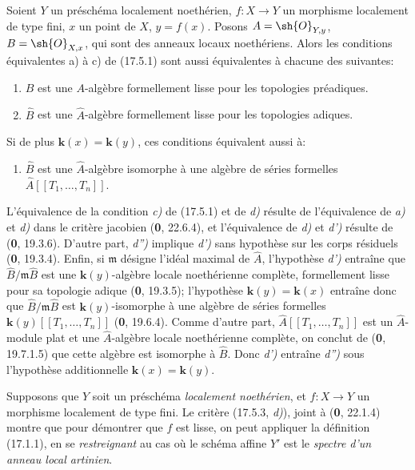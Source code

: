 \begin{proposition}[17.5.3]
\label{IV.17.5.3}
Soient $Y$ un préschéma \textup{localement noethérien}, $f:X\to Y$ un morphisme localement de type fini, $x$ un point de $X$, $y=f(x)$. Posons $A=\sh{O}_{Y,y}$, $B=\sh{O}_{X,x}$, qui sont des anneaux locaux noethériens. Alors les conditions équivalentes \textup{a)} à \textup{c)} de \textup{(17.5.1)} sont aussi équivalentes à chacune des suivantes:
\begin{enumerate}
  \item[\textup{d)}] $B$ est une $A$-algèbre formellement lisse pour les topologies préadiques.
  \item[\textup{d$'$)}] $\widehat B$ est une $\widehat A$-algèbre formellement lisse pour les topologies adiques.
\end{enumerate}
Si de plus $\boldsymbol{k}(x)=\boldsymbol{k}(y)$, ces conditions équivalent aussi à:
\begin{enumerate}
  \item[\textup{d$''$)}] $\widehat B$ est une $\widehat A$-algèbre isomorphe à une algèbre de séries formelles $\widehat A[[T_1,\ldots,T_n]]$.
\end{enumerate}
\end{proposition}

L'équivalence de la condition \emph{c)} de (17.5.1) et de \emph{d)} résulte de l'équivalence de \emph{a)} et \emph{d)} dans le critère jacobien (\textbf{0}, 22.6.4), et l'équivalence de \emph{d)} et \emph{d')} résulte de (\textbf{0}, 19.3.6). D'autre part, \emph{d'')} implique \emph{d')} sans hypothèse sur les corps résiduels (\textbf{0}, 19.3.4). Enfin, si $\mathfrak m$ désigne l'idéal maximal de $\widehat A$, l'hypothèse \emph{d')} entraîne que $\widehat B/\mathfrak m\widehat B$ est une $\boldsymbol{k}(y)$-algèbre locale noethérienne complète, formellement lisse pour sa topologie adique (\textbf{0}, 19.3.5); l'hypothèse $\boldsymbol{k}(y)=\boldsymbol{k}(x)$ entraîne donc que $\widehat B/\mathfrak m\widehat B$ est $\boldsymbol{k}(y)$-isomorphe à une algèbre de séries formelles $\boldsymbol{k}(y)[[T_1,\ldots,T_n]]$ (\textbf{0}, 19.6.4). Comme d'autre part, $\widehat A[[T_1,\ldots,T_n]]$ est un $\widehat A$-module plat et une $\widehat A$-algèbre locale noethérienne complète, on conclut de (\textbf{0}, 19.7.1.5) que cette algèbre est isomorphe à $\widehat B$. Donc \emph{d')} entraîne \emph{d'')} sous l'hypothèse additionnelle $\boldsymbol{k}(x)=\boldsymbol{k}(y)$.

\begin{remark}[17.5.4]
\label{IV.17.5.4}
Supposons que $Y$ soit un préschéma \emph{localement noethérien}, et $f:X\to Y$ un morphisme localement de type fini. Le critère (17.5.3, \emph{d)}), joint à (\textbf{0}, 22.1.4) montre que pour démontrer que $f$ est lisse, on peut appliquer la définition (17.1.1), en se \emph{restreignant} au cas où le schéma affine $Y'$ est le \emph{spectre d'un anneau local artinien}.
\end{remark}

